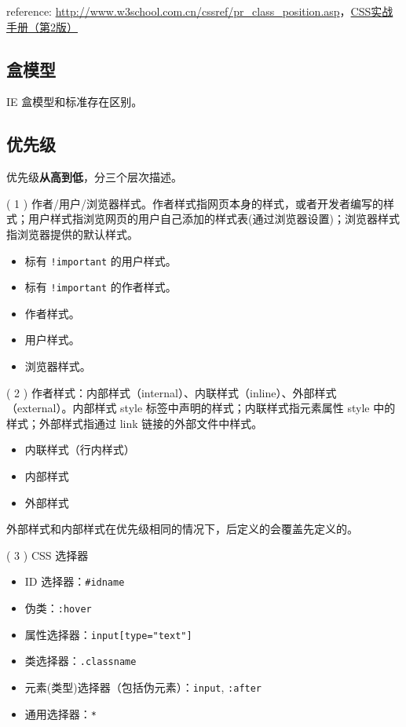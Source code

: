reference: \href{http://www.w3school.com.cn/cssref/pr\_class\_position.asp}{http://www.w3school.com.cn/cssref/pr\_class\_position.asp}，\href{http://book.douban.com/subject/4861462/}{CSS实战手册（第2版）}

\subsection{盒模型}\hypertarget{section-1}{}\label{section-1}

IE 盒模型和标准存在区别。

\subsection{优先级}\hypertarget{section-2}{}\label{section-2}

优先级\textbf{从高到低}，分三个层次描述。

( 1 ) 作者/用户/浏览器样式。作者样式指网页本身的样式，或者开发者编写的样式；用户样式指浏览网页的用户自己添加的样式表(通过浏览器设置)；浏览器样式指浏览器提供的默认样式。

\begin{itemize}
\item 标有 \texttt{!important} 的用户样式。
\item 标有 \texttt{!important} 的作者样式。
\item 作者样式。
\item 用户样式。
\item 浏览器样式。
\end{itemize}

( 2 ) 作者样式：内部样式（internal）、内联样式（inline）、外部样式（external）。内部样式 style 标签中声明的样式；内联样式指元素属性 style 中的样式；外部样式指通过 link 链接的外部文件中样式。

\begin{itemize}
\item 内联样式（行内样式）
\item 内部样式
\item 外部样式
\end{itemize}

外部样式和内部样式在优先级相同的情况下，后定义的会覆盖先定义的。

( 3 ) CSS 选择器

\begin{itemize}
\item ID 选择器：\texttt{\#idname}
\item 伪类：\texttt{:hover}
\item 属性选择器：\texttt{input[type="text"]}
\item 类选择器：\texttt{.classname}
\item 元素(类型)选择器（包括伪元素）：\texttt{input}, \texttt{:after}
\item 通用选择器：\texttt{*}
\end{itemize}

